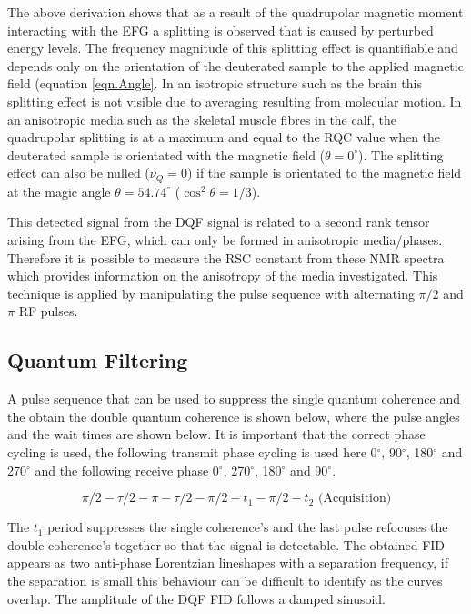 \documentclass[class=article, crop=false]{standalone}
\begin{document}
The above derivation shows that as a result of the quadrupolar magnetic moment interacting with the EFG a splitting is observed that is caused by perturbed energy levels. The frequency magnitude of this splitting effect is quantifiable and depends only on the orientation of the deuterated sample to the applied magnetic field (equation \ref{eqn.Angle}. In an isotropic structure such as the brain this splitting effect is not visible due to averaging resulting from molecular motion. In an anisotropic media such as the skeletal muscle fibres in the calf, the quadrupolar splitting is at a maximum and equal to the RQC value when the deuterated sample is orientated with the magnetic field ($\theta = 0^\circ$). The splitting effect can also be nulled ($\nu_Q = 0$) if the sample is orientated to the magnetic field at the magic angle $\theta = 54.74^\circ$ ($\cos^2\theta=1/3$).

This detected signal from the DQF signal is related to a second rank tensor arising from the EFG, which can only be formed in anisotropic media/phases. Therefore it is possible to measure the RSC constant from these NMR spectra which provides information on the anisotropy of the media investigated. This technique is applied by manipulating the pulse sequence with alternating $\pi/2$ and $\pi$ RF pulses. 

\subsection{Quantum Filtering}

A pulse sequence that can be used to suppress the single quantum coherence and the obtain the double quantum coherence is shown below\cite{Sharf1995DetectionNMR-Spectroscopy}, where the pulse angles and the wait times are shown below. It is important that the correct phase cycling is used\cite{Bodenhausen1984SelectionExperiments}, the following transmit phase cycling is used here 0$^\circ$, 90$^\circ$, 180$^\circ$ and 270$^\circ$ and the following receive phase 0$^\circ$, 270$^\circ$, 180$^\circ$ and 90$^\circ$. 

\begin{equation}
    \pi/2-\tau/2-\pi-\tau/2-\pi/2-t_1-\pi/2-t_2 \textrm{ (Acquisition)}
    \label{eqn:Quad:Pulse}
\end{equation}

The $t_1$ period suppresses the single coherence's and the last pulse refocuses the double coherence's together so that the signal is detectable. The obtained FID appears as two anti-phase Lorentzian lineshapes with a separation frequency, if the separation is small this behaviour can be difficult to identify as the curves overlap. The amplitude of the DQF FID follows a damped sinusoid.
\end{document}
